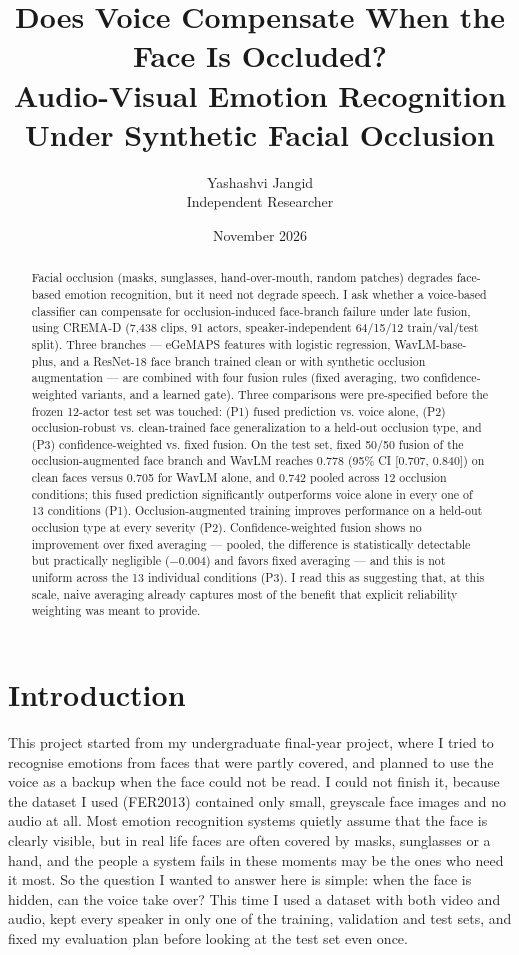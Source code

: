 \documentclass[10pt]{article}
\title{\large Does Voice Compensate When the Face Is Occluded?\\
Audio-Visual Emotion Recognition Under Synthetic Facial Occlusion}
\author{Yashashvi Jangid\\ \small Independent Researcher}
\date{November 2026}
\begin{document}
\maketitle

\begin{abstract}
\noindent
Facial occlusion (masks, sunglasses, hand-over-mouth, random patches) degrades face-based emotion
recognition, but it need not degrade speech. I ask whether a voice-based classifier can
compensate for occlusion-induced face-branch failure under late fusion, using CREMA-D (7,438 clips,
91 actors, speaker-independent 64/15/12 train/val/test split). Three branches --- eGeMAPS features with
logistic regression, WavLM-base-plus, and a ResNet-18 face branch trained clean or with synthetic
occlusion augmentation --- are combined with four fusion rules (fixed averaging, two confidence-weighted
variants, and a learned gate). Three comparisons were pre-specified before the frozen 12-actor test set
was touched: (P1) fused prediction vs. voice alone, (P2) occlusion-robust vs. clean-trained face
generalization to a held-out occlusion type, and (P3) confidence-weighted vs. fixed fusion. On the test
set, fixed 50/50 fusion of the occlusion-augmented face branch and WavLM reaches 0.778 (95\% CI
[0.707, 0.840]) on clean faces versus 0.705 for WavLM alone, and 0.742 pooled across 12 occlusion
conditions; this fused prediction significantly outperforms voice alone in every one of 13 conditions
(P1). Occlusion-augmented training improves performance on a held-out occlusion type at every severity
(P2). Confidence-weighted fusion shows no improvement over fixed averaging --- pooled, the difference is
statistically detectable but practically negligible ($-0.004$) and favors fixed averaging --- and this is
not uniform across the 13 individual conditions (P3). I read this as suggesting that, at this scale,
naive averaging already captures most of the benefit that explicit reliability weighting was meant to
provide.
\end{abstract}

\section{Introduction}
\label{sec:intro}

This project started from my undergraduate final-year project, where I tried to recognise emotions
from faces that were partly covered, and planned to use the voice as a backup when the face could not
be read. I could not finish it, because the dataset I used (FER2013) contained only small, greyscale
face images and no audio at all. Most emotion recognition systems quietly assume that the face is
clearly visible, but in real life faces are often covered by masks, sunglasses or a hand, and the
people a system fails in these moments may be the ones who need it most. So the question I wanted to
answer here is simple: when the face is hidden, can the voice take over? This time I used a dataset
with both video and audio, kept every speaker in only one of the training, validation and test sets,
and fixed my evaluation plan before looking at the test set even once.
\end{document}
